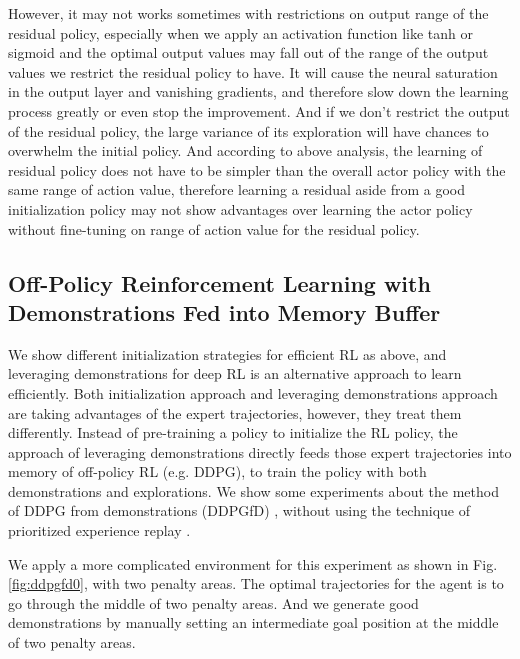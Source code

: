 \documentclass{article}
\begin{document}
However, it may not works sometimes with restrictions on output range of the residual policy, especially when we apply an activation function like tanh or sigmoid and the optimal output values may fall out of the range of the output values we restrict the residual policy to have. It will cause the neural saturation in the output layer and vanishing gradients, and therefore slow down the learning process greatly or even stop the improvement. And if we don't restrict the output of the residual policy, the large variance of its exploration will have chances to overwhelm the initial policy. And according to above analysis, the learning of residual policy does not have to be simpler than the overall actor policy with the same range of action value, therefore learning a residual aside from a good initialization policy may not show advantages over learning the actor policy without fine-tuning on range of action value for the residual policy.

\subsection{Off-Policy Reinforcement Learning with Demonstrations Fed into Memory Buffer}
We show different initialization strategies for efficient RL as above, and leveraging demonstrations for deep RL is an alternative approach to learn efficiently. Both initialization approach and leveraging demonstrations approach are taking advantages of the expert trajectories, however, they treat them differently. Instead of pre-training a policy to initialize the RL policy, the approach of leveraging demonstrations directly feeds those expert trajectories into memory of off-policy RL (e.g. DDPG), to train the policy with both demonstrations and explorations. We show some experiments about the method of DDPG from demonstrations (DDPGfD) \cite{vevcerik2017leveraging}, without using the technique of prioritized experience replay \cite{schaul2015prioritized}.

We apply a more complicated environment for this experiment as shown in Fig. \ref{fig:ddpgfd0}, with two penalty areas. The optimal trajectories for the agent is to go through the middle of two penalty areas. And we generate good demonstrations by manually setting an intermediate goal position at the middle of two penalty areas.
\end{document}
